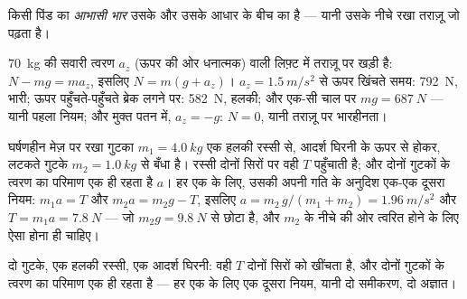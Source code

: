 \begin{definition}[आभासी भार]\label{def:g12:newtons-laws:apparent}
किसी पिंड का \emph{आभासी भार} उसके और उसके आधार के बीच का
 है --- यानी उसके नीचे रखा तराज़ू जो पढ़ता है।
\end{definition}

\begin{example}[लिफ़्ट]\label{ex:g12:newtons-laws:elevator}
\qty{70}{kg} की सवारी  त्वरण $a_z$ (ऊपर की ओर धनात्मक) वाली लिफ़्ट में
तराज़ू पर खड़ी है: $N - mg = ma_z$, इसलिए $N = m(g + a_z)$। $a_z = \qty{1.5}{m/s^2}$ से ऊपर खिंचते समय: \qty{792}{N},
भारी; ऊपर पहुँचते-पहुँचते ब्रेक लगने पर: \qty{582}{N}, हलकी; और एक-सी चाल पर
$mg = \qty{687}{N}$ --- यानी पहला नियम; और मुक्त पतन में, $a_z = -g$: $N = 0$, यानी तराज़ू पर
भारहीनता।
\end{example}

\begin{example}[दो गुटके और एक घिरनी]\label{ex:g12:newtons-laws:pulley}
घर्षणहीन मेज़ पर रखा गुटका $m_1 = \qty{4.0}{kg}$ एक हलकी रस्सी से, आदर्श घिरनी के ऊपर से
होकर, लटकते गुटके $m_2 = \qty{1.0}{kg}$ से बँधा है। रस्सी दोनों सिरों पर वही 
$T$ पहुँचाती है; और दोनों गुटकों के त्वरण का परिमाण एक ही रहता है $a$।
हर एक के लिए, उसकी अपनी गति के अनुदिश एक-एक दूसरा नियम: $m_1 a = T$ और $m_2 a = m_2 g - T$,
इसलिए $a = m_2\,g/(m_1 + m_2) = \qty{1.96}{m/s^2}$ और $T = m_1 a = \qty{7.8}{N}$ --- जो $m_2 g = \qty{9.8}{N}$ से छोटा है, और $m_2$ के नीचे की ओर
त्वरित होने के लिए ऐसा होना ही चाहिए।
\end{example}

\begin{omfigure}

{\small दो गुटके, एक हलकी रस्सी, एक आदर्श घिरनी: वही  $T$
दोनों सिरों को खींचता है, और दोनों गुटकों के त्वरण का परिमाण एक ही रहता है ---
हर एक के लिए एक दूसरा नियम, यानी दो समीकरण, दो अज्ञात।}
\end{omfigure}

